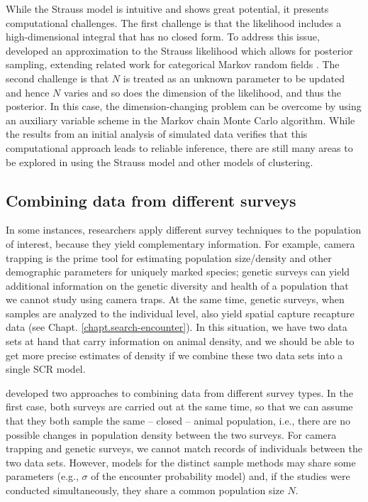 While the Strauss model is intuitive and shows great potential, it
presents computational challenges. The first challenge is that the
likelihood includes a high-dimensional integral that has no closed
form. To address this issue, \citet{reich_etal:2012} developed an
approximation to the Strauss likelihood which allows for posterior
sampling, extending related work for categorical Markov random fields
\citep{green_richardson:2002,smith_smith:2006}. The second challenge
is that $N$ is treated as an unknown parameter to be updated and hence
$N$ varies and so does the dimension of the likelihood, and thus the
posterior. In this case, the dimension-changing problem can be
overcome by using an auxiliary variable scheme in the Markov chain
Monte Carlo algorithm.
While the results from an initial analysis of simulated data verifies
that this computational approach leads to reliable inference, there
are still many areas to be explored in using the Strauss model and
other models of clustering.


\subsection{Combining data from different surveys}

In some instances, researchers apply different survey techniques to
the population of interest, because they yield complementary
information. For example, camera trapping is the prime tool for
estimating population size/density and other demographic parameters
for uniquely marked species; genetic surveys can yield additional
information on the genetic diversity and health of a population that
we cannot study using camera traps. At the same time, genetic surveys,
when samples are analyzed to the individual level, also yield spatial
capture recapture data (see Chapt. \ref{chapt.search-encounter}). In
this situation, we have two data sets at hand that carry information
on animal density, and we should be able to get more precise estimates
of density if we combine these two data sets into a single SCR model.

\citet{gopalaswamy_etal:2012mee} developed two approaches to combining
data from different survey types. In the first case, both surveys are
carried out at the same time, so that we can assume that they both
sample the same -- closed -- animal population, i.e., there are no
possible changes in population density between the two surveys. For
camera trapping and genetic surveys, we cannot match records of
individuals between the two data sets. However, models for the
distinct sample methods may share some parameters (e.g., $\sigma$ of
the encounter probability model) and, if the studies were conducted
simultaneously, they share a common population size $N$.

